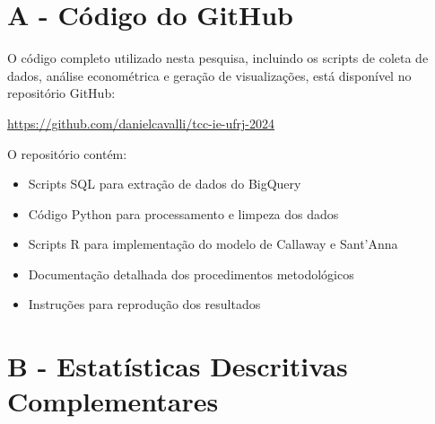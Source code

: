 \documentclass[
	12pt,				%
	oneside,			%
	a4paper,			%
	english,			%
	french,				%
	spanish,			%
	brazil				%
	]{abntex2}
\begin{document}


%
%


\begin{apendicesenv}

\partapendices

\chapter{A - Código do GitHub}

O código completo utilizado nesta pesquisa, incluindo os scripts de coleta de dados, análise econométrica e geração de visualizações, está disponível no repositório GitHub:

\url{https://github.com/danielcavalli/tcc-ie-ufrj-2024}

O repositório contém:
\begin{itemize}
\item Scripts SQL para extração de dados do BigQuery
\item Código Python para processamento e limpeza dos dados
\item Scripts R para implementação do modelo de Callaway e Sant'Anna
\item Documentação detalhada dos procedimentos metodológicos
\item Instruções para reprodução dos resultados
\end{itemize}

\chapter{B - Estatísticas Descritivas Complementares}


\end{apendicesenv}
\end{document}
